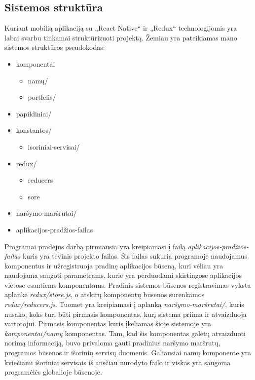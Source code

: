\documentclass[a4paper,12pt,fleqn]{article}
\begin{document}
\subsection{Sistemos struktūra}
Kuriant mobilią aplikaciją su „React Native“ ir „Redux“ technologijomis yra labai svarbu tinkamai struktūrizuoti projektą. Žemiau yra pateikiamas mano sistemos struktūros pseudokodas:
\begin{itemize}[noitemsep]
\item komponentai
	\begin{itemize}[noitemsep]
		\item namų/
		\item portfelis/
	\end{itemize}
\item papildiniai/
\item konstantos/
	\begin{itemize}[noitemsep]
		\item isoriniai-servisai/
	\end{itemize}
\item redux/
	\begin{itemize}[noitemsep]
		\item reducers
		\item sore
	\end{itemize}
\item naršymo-maršrutai/
\item aplikacijos-pradžios-failas
\end{itemize}

Programai pradėjus darbą pirmiausia yra kreipiamasi į failą \textit{aplikacijos-pradžios-failas} kuris yra tėvinis projekto failas. Šis failas sukuria programoje naudojamus komponentus ir užregistruoja pradinę aplikacijos būseną, kuri vėliau yra naudojama saugoti parametrams, kurie yra perduodami skirtingose aplikacijos vietose esantiems komponentams. Pradinis sistemos būsenos registravimas vyksta aplanke \textit{redux/store.js}, o atskirų komponentų būsenos surenkamos \textit{redux/reducers.js}. Tuomet yra kreipiamasi į aplanką \textit{naršymo-maršrutai/}, kuris nusako, koks turi būti pirmasis komponentas, kurį sistema priima ir atvaizduoja vartotojui. Pirmasis komponentas kuris įkeliamas šioje sistemoje yra \textit{komponentai/namų} komponentas. Tam, kad šis komponentas galėtų atvaizduoti norimą informaciją, buvo privaloma gauti pradinius naršymo maršrutų, programos būsenos ir išorinių servisų duomenis. Galiausiai namų komponente yra kviečiami išoriniai servisais iš ansčiau nurodyto failo ir viskas yra saugoma programėlės globalioje būsenoje.
\end{document}
